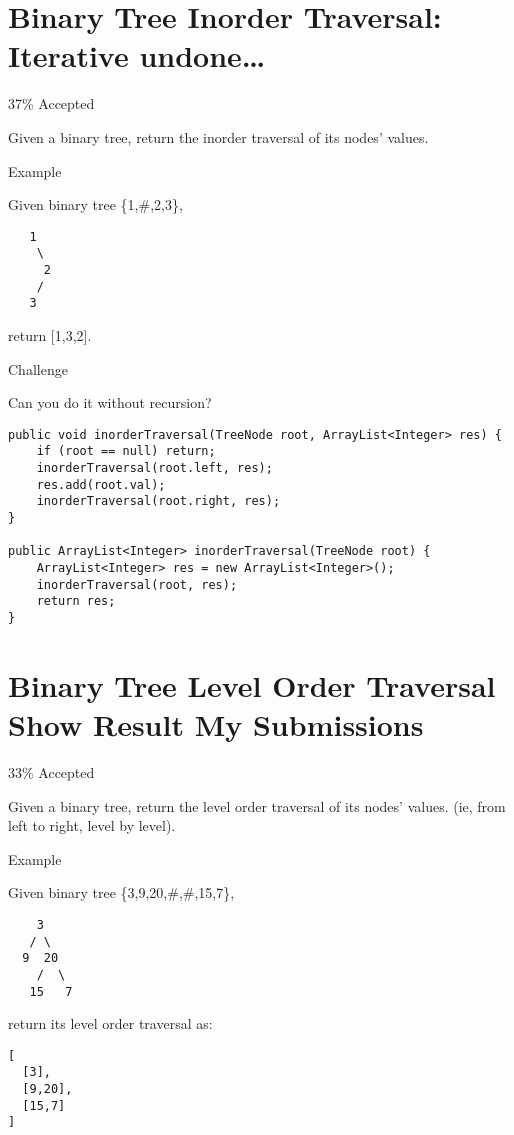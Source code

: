 \documentclass[12pt]{book}
\begin{document}
\chapter{Binary Tree Inorder Traversal: Iterative undone\ldots{}}
\label{sec-14}

37\% Accepted

Given a binary tree, return the inorder traversal of its nodes' values.

Example

Given binary tree \{1,\#,2,3\},
\lstset{language=java,label= ,caption= ,numbers=none}
\begin{lstlisting}
   1
    \
     2
    /
   3
\end{lstlisting}

return [1,3,2].

Challenge

Can you do it without recursion?
\lstset{language=java,label= ,caption= ,numbers=none}
\begin{lstlisting}
public void inorderTraversal(TreeNode root, ArrayList<Integer> res) {
    if (root == null) return;
    inorderTraversal(root.left, res);
    res.add(root.val);
    inorderTraversal(root.right, res);
}
        
public ArrayList<Integer> inorderTraversal(TreeNode root) {
    ArrayList<Integer> res = new ArrayList<Integer>();
    inorderTraversal(root, res);
    return res;
}
\end{lstlisting}
\chapter{Binary Tree Level Order Traversal Show Result My Submissions}
\label{sec-15}

33\% Accepted

Given a binary tree, return the level order traversal of its nodes' values. (ie, from left to right, level by level).

Example

Given binary tree \{3,9,20,\#,\#,15,7\},
\lstset{language=java,label= ,caption= ,numbers=none}
\begin{lstlisting}
    3
   / \
  9  20
    /  \
   15   7
\end{lstlisting}

return its level order traversal as:
\lstset{language=java,label= ,caption= ,numbers=none}
\begin{lstlisting}
[
  [3],
  [9,20],
  [15,7]
]
\end{lstlisting}
\end{document}
